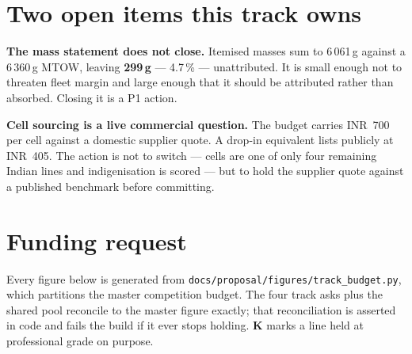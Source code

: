 \documentclass[11pt,a4paper]{article}
\newcommand{\inr}[1]{INR~#1}
\begin{document}
\section{Two open items this track owns}

\textbf{The mass statement does not close.} Itemised masses sum to 6\,061\,g
against a 6\,360\,g MTOW, leaving \textbf{299\,g} --- 4.7\,\% --- unattributed.
It is small enough not to threaten fleet margin and large enough that it should
be attributed rather than absorbed. Closing it is a P1 action.

\textbf{Cell sourcing is a live commercial question.} The budget carries
\inr{700} per cell against a domestic supplier quote. A drop-in equivalent lists
publicly at \inr{405}. The action is not to switch --- cells are one of only
four remaining Indian lines and indigenisation is scored --- but to hold the
supplier quote against a published benchmark before committing.

\section{Funding request}

Every figure below is generated from
\texttt{docs/proposal/figures/track\_budget.py}, which partitions the master
competition budget. The four track asks plus the shared pool reconcile to the
master figure exactly; that reconciliation is asserted in code and fails the
build if it ever stops holding. \textbf{K} marks a line held at professional
grade on purpose.
\end{document}
